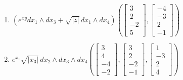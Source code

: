 \begin{question}
\begin{enumerate}
  \item[(e)] $\left(e^{xy}dx_1\wedge dx_3+\sqrt{|z|}\,dx_1\wedge dx_4\right)\left(\begin{bmatrix}3\\2\\-2\\5\end{bmatrix},\begin{bmatrix}-4\\-3\\2\\-1\end{bmatrix}\right)$
  \item[(f)] $e^{x_1}\sqrt{|x_3|}\,dx_2\wedge dx_3\wedge dx_4\left(\begin{bmatrix}3\\4\\-4\\-2\end{bmatrix},\begin{bmatrix}3\\2\\-2\\-1\end{bmatrix},\begin{bmatrix}1\\-3\\2\\4\end{bmatrix}\right)$
\end{enumerate}
\end{question}

